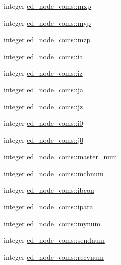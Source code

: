 \begin{DoxyCompactItemize}
\item 
integer \hyperlink{namespaceed__node__coms_aafd80e646c35b816ee0f00fabe97cc03}{ed\+\_\+node\+\_\+coms\+::mxp}
\item 
integer \hyperlink{namespaceed__node__coms_a23d910277f538c44e6429f09fa8bcd55}{ed\+\_\+node\+\_\+coms\+::myp}
\item 
integer \hyperlink{namespaceed__node__coms_a028141a8eb07c83d3f5f8075fbe1d236}{ed\+\_\+node\+\_\+coms\+::mzp}
\item 
integer \hyperlink{namespaceed__node__coms_a78402c54439b56822a5a8e6812a3ad90}{ed\+\_\+node\+\_\+coms\+::ia}
\item 
integer \hyperlink{namespaceed__node__coms_a29c92ad4b60b88059dac8a8291b4553b}{ed\+\_\+node\+\_\+coms\+::iz}
\item 
integer \hyperlink{namespaceed__node__coms_a49471084e0370630b07db902c46c2ea8}{ed\+\_\+node\+\_\+coms\+::ja}
\item 
integer \hyperlink{namespaceed__node__coms_a58a0ce85c36bbb54b835b48d62281519}{ed\+\_\+node\+\_\+coms\+::jz}
\item 
integer \hyperlink{namespaceed__node__coms_a6326a182f11b478fe044adfb8a29573f}{ed\+\_\+node\+\_\+coms\+::i0}
\item 
integer \hyperlink{namespaceed__node__coms_a1767484e9dd38f3c6b443cd2202283a0}{ed\+\_\+node\+\_\+coms\+::j0}
\item 
integer \hyperlink{namespaceed__node__coms_a07ddd50e92be990673b9c78656aaade5}{ed\+\_\+node\+\_\+coms\+::master\+\_\+num}
\item 
integer \hyperlink{namespaceed__node__coms_a6eaf5989fc4f739cb5003064f0355966}{ed\+\_\+node\+\_\+coms\+::mchnum}
\item 
integer \hyperlink{namespaceed__node__coms_a15c70a911fbe3be8baecfaa2c78e5340}{ed\+\_\+node\+\_\+coms\+::ibcon}
\item 
integer \hyperlink{namespaceed__node__coms_a6b574c65e348d02c2d74df596965828a}{ed\+\_\+node\+\_\+coms\+::ipara}
\item 
integer \hyperlink{namespaceed__node__coms_a2248da5b8f20480c3d693062b51a186b}{ed\+\_\+node\+\_\+coms\+::mynum}
\item 
integer \hyperlink{namespaceed__node__coms_ac61164ac357567b425c4b2102af970fb}{ed\+\_\+node\+\_\+coms\+::sendnum}
\item 
integer \hyperlink{namespaceed__node__coms_ae516cc09ceda6c63673e5972aa6a6963}{ed\+\_\+node\+\_\+coms\+::recvnum}
\item 

\end{DoxyCompactItemize}

